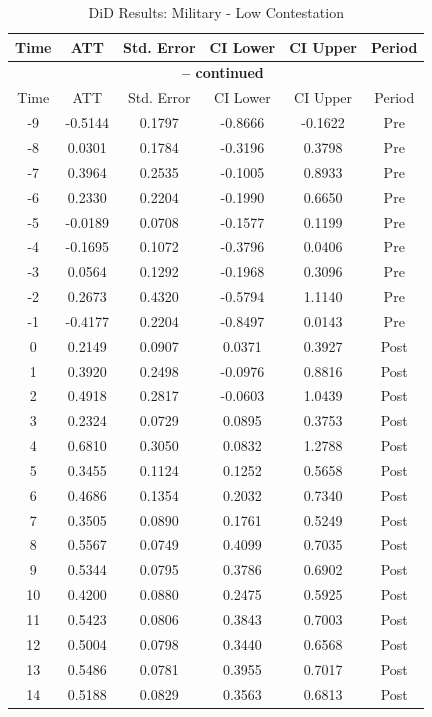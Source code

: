 \documentclass[bibtex]{article}
\begin{document}
{\begin{longtable}{cccccc}
\caption{DiD Results: Military - Low Contestation} \label{tab:mil_low} \\
\toprule
Time & ATT & Std. Error & CI Lower & CI Upper & Period \\
\midrule
\endfirsthead
\multicolumn{6}{c}{{\bfseries \tablename\ \thetable{} -- continued}} \\
\toprule
Time & ATT & Std. Error & CI Lower & CI Upper & Period \\
\midrule
\endhead
-9 & -0.5144 & 0.1797 & -0.8666 & -0.1622 & Pre \\
-8 & 0.0301 & 0.1784 & -0.3196 & 0.3798 & Pre \\
-7 & 0.3964 & 0.2535 & -0.1005 & 0.8933 & Pre \\
-6 & 0.2330 & 0.2204 & -0.1990 & 0.6650 & Pre \\
-5 & -0.0189 & 0.0708 & -0.1577 & 0.1199 & Pre \\
-4 & -0.1695 & 0.1072 & -0.3796 & 0.0406 & Pre \\
-3 & 0.0564 & 0.1292 & -0.1968 & 0.3096 & Pre \\
-2 & 0.2673 & 0.4320 & -0.5794 & 1.1140 & Pre \\
-1 & -0.4177 & 0.2204 & -0.8497 & 0.0143 & Pre \\
0 & 0.2149 & 0.0907 & 0.0371 & 0.3927 & Post \\
1 & 0.3920 & 0.2498 & -0.0976 & 0.8816 & Post \\
2 & 0.4918 & 0.2817 & -0.0603 & 1.0439 & Post \\
3 & 0.2324 & 0.0729 & 0.0895 & 0.3753 & Post \\
4 & 0.6810 & 0.3050 & 0.0832 & 1.2788 & Post \\
5 & 0.3455 & 0.1124 & 0.1252 & 0.5658 & Post \\
6 & 0.4686 & 0.1354 & 0.2032 & 0.7340 & Post \\
7 & 0.3505 & 0.0890 & 0.1761 & 0.5249 & Post \\
8 & 0.5567 & 0.0749 & 0.4099 & 0.7035 & Post \\
9 & 0.5344 & 0.0795 & 0.3786 & 0.6902 & Post \\
10 & 0.4200 & 0.0880 & 0.2475 & 0.5925 & Post \\
11 & 0.5423 & 0.0806 & 0.3843 & 0.7003 & Post \\
12 & 0.5004 & 0.0798 & 0.3440 & 0.6568 & Post \\
13 & 0.5486 & 0.0781 & 0.3955 & 0.7017 & Post \\
14 & 0.5188 & 0.0829 & 0.3563 & 0.6813 & Post \\

\end{longtable}}
\end{document}
